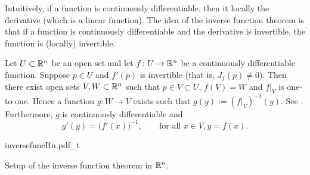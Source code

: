 Intuitively, if a function is continuously differentiable, then it
locally  the derivative (which is a linear function).
The idea of the inverse function theorem is that if a function is
continuously differentiable and the derivative is invertible, the function is
(locally) invertible.


\begin{thm}
\label{thm:inverse}
Let $U \subset {\mathbb{R}}^n$ be an open set and let
$f \colon U \to {\mathbb{R}}^n$ be a continuously differentiable function.
Suppose $p \in U$ and $f'(p)$ is invertible
(that is, $J_f(p) \not=0$).
Then there exist open sets $V, W \subset {\mathbb{R}}^n$ such that
$p \in V \subset U$, $f(V) = W$ and $f|_V$ is one-to-one.  
Hence a function $g \colon W \to V$ exists such that
$g(y) := (f|_V)^{-1}(y)$.
See .
Furthermore, $g$ is continuously differentiable
and 
\begin{equation*}
g'(y) = {\bigl(f'(x)\bigr)}^{-1}, \qquad \text{for all } x \in V, y = f(x).
\end{equation*}
\end{thm}

\begin{myfigureht}
{inversefuncRn.pdf_t}
\caption{Setup of the inverse function theorem in ${\mathbb{R}}^n$.\label{fig:inversefuncRn}}
\end{myfigureht}

